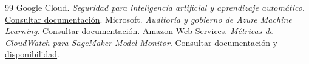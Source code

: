 \begin{thebibliography}{99}
 Google Cloud. \textit{Seguridad para inteligencia artificial y aprendizaje automático}. \href{https://docs.cloud.google.com/architecture/framework/perspectives/ai-ml/security}{Consultar documentación}.
 Microsoft. \textit{Auditoría y gobierno de Azure Machine Learning}. \href{https://learn.microsoft.com/en-us/azure/machine-learning/how-to-integrate-azure-policy?view=azureml-api-2}{Consultar documentación}.
 Amazon Web Services. \textit{Métricas de CloudWatch para SageMaker Model Monitor}. \href{https://docs.aws.amazon.com/sagemaker/latest/dg/model-monitor-interpreting-cloudwatch.html}{Consultar documentación y disponibilidad}.
\end{thebibliography}
